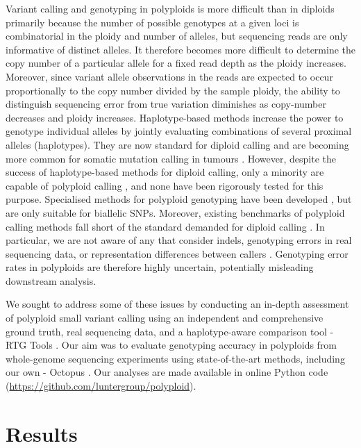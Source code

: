 \documentclass[notitlepage, twocolumn, 10pt]{article}
\begin{document}
Variant calling and genotyping in polyploids is more difficult than in diploids primarily because the number of possible genotypes at a given loci is combinatorial in the ploidy and number of alleles, but sequencing reads are only informative of distinct alleles. It therefore becomes more difficult to determine the copy number of a particular allele for a fixed read depth as the ploidy increases. Moreover, since variant allele observations in the reads are expected to occur proportionally to the copy number divided by the sample ploidy, the ability to distinguish sequencing error from true variation diminishes as copy-number decreases and ploidy increases. Haplotype-based methods increase the power to genotype individual alleles by jointly evaluating combinations of several proximal alleles (haplotypes). They are now standard for diploid calling \cite{RN663, RN598, RN538, RN604, RN619, RN5} and are becoming more common for somatic mutation calling in tumours \cite{RN663}. However, despite the success of haplotype-based methods for diploid calling, only a minority are capable of polyploid calling \cite{RN663, RN598, RN538}, and none have been rigorously tested for this purpose. Specialised methods for polyploid genotyping have been developed \cite{RN666, RN662, RN674}, but are only suitable for biallelic SNPs. Moreover, existing benchmarks of polyploid calling methods fall short of the standard demanded for diploid calling \cite{RN655, RN656, RN675}. In particular, we are not aware of any that consider indels, genotyping errors in real sequencing data, or representation differences between callers \cite{RN675}. Genotyping error rates in polyploids are therefore highly uncertain, potentially misleading downstream analysis.

We sought to address some of these issues by conducting an in-depth assessment of polyploid small variant calling using an independent and comprehensive ground truth, real sequencing data, and a haplotype-aware comparison tool - RTG Tools \cite{RN169}. Our aim was to evaluate genotyping accuracy in polyploids from whole-genome sequencing experiments using state-of-the-art methods, including our own - Octopus \cite{RN663}. Our analyses are made available in online Python code (\url{https://github.com/luntergroup/polyploid}).

\section*{Results}
\end{document}
